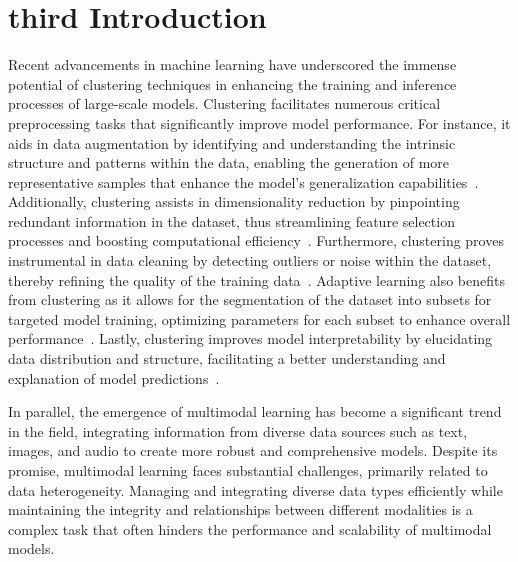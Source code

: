 \documentclass[journal]{IEEEtran}
\renewcommand{\cite}[1]{~\autocite{#1}}
\begin{document}
\section{third Introduction}
Recent advancements in machine learning have underscored the immense potential of clustering techniques in enhancing the training and inference processes of large-scale models.
Clustering facilitates numerous critical preprocessing tasks that significantly improve model performance.
For instance, it aids in data augmentation by identifying and understanding the intrinsic structure and patterns within the data, enabling the generation of more representative samples that enhance the model's generalization capabilities\cite{raskutti2002CombiningClusteringCotraining}.
Additionally, clustering assists in dimensionality reduction by pinpointing redundant information in the dataset, thus streamlining feature selection processes and boosting computational efficiency\cite{li2014ClusteringguidedSparseStructural}.
Furthermore, clustering proves instrumental in data cleaning by detecting outliers or noise within the dataset, thereby refining the quality of the training data\cite{ghimatgar2018ImprovedFeatureSelection}.
Adaptive learning also benefits from clustering as it allows for the segmentation of the dataset into subsets for targeted model training, optimizing parameters for each subset to enhance overall performance\cite{li2023DistributedClusteringCooperative}.
Lastly, clustering improves model interpretability by elucidating data distribution and structure, facilitating a better understanding and explanation of model predictions\cite{bertsimas2020InterpretableClusteringOptimization}.

In parallel, the emergence of multimodal learning has become a significant trend in the field, integrating information from diverse data sources such as text, images, and audio to create more robust and comprehensive models. Despite its promise, multimodal learning faces substantial challenges, primarily related to data heterogeneity. Managing and integrating diverse data types efficiently while maintaining the integrity and relationships between different modalities is a complex task that often hinders the performance and scalability of multimodal models.
\end{document}
